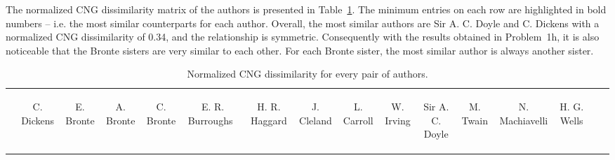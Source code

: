 \documentclass[conference]{IEEEtran}
\begin{document}
The normalized CNG dissimilarity matrix of the authors is presented in Table~\ref{tab:problem1i}.
The minimum entries on each row are highlighted in bold numbers -- i.e. the most similar counterparts for each author.
Overall, the most similar authors are Sir A. C. Doyle and C. Dickens with a normalized CNG dissimilarity of 0.34, and the relationship is symmetric.
Consequently with the results obtained in Problem~1h, it is also noticeable that the Bronte sisters are very similar to each other.
For each Bronte sister, the most similar author is always another sister.

\begin{table}[htb]
\caption{Normalized CNG dissimilarity for every pair of authors.\label{tab:problem1i}}
\vspace{-10pt}
\renewcommand{\arraystretch}{1.5}
\begin{center}
\begin{tabular}{r|ccccccccccccccc}
 & \begin{sideways}
C. Dickens
\end{sideways} & \begin{sideways}
E. Bronte
\end{sideways} & \begin{sideways}
A. Bronte
\end{sideways} & \begin{sideways}
C. Bronte
\end{sideways} & \begin{sideways}
E. R. Burroughs~
\end{sideways} & \begin{sideways}
H. R. Haggard
\end{sideways} & \begin{sideways}
J. Cleland
\end{sideways} & \begin{sideways}
L. Carroll
\end{sideways} & \begin{sideways}
W. Irving
\end{sideways} & \begin{sideways}
Sir A. C. Doyle
\end{sideways} & \begin{sideways}
M. Twain
\end{sideways} & \begin{sideways}
N. Machiavelli
\end{sideways} & \begin{sideways}
H. G. Wells
\end{sideways} & \begin{sideways}

\end{sideways}
\end{tabular}
\end{center}
\end{table}
\end{document}
